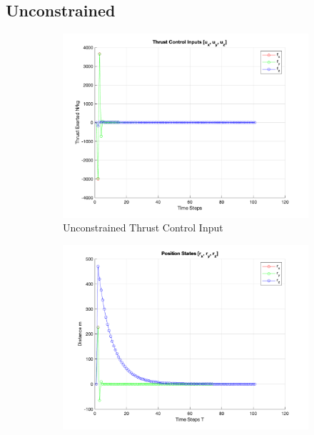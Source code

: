 \documentclass[conference, tikz]{IEEEtran}
\begin{document}
\subsection{Unconstrained}
\begin{figure}[H]
    \centering
    \begin{subfigure}{\columnwidth}
        \centering
        \includegraphics[width=\columnwidth]{new_final_figs/Unconstrained_input_plot.png}
        \caption{Unconstrained Thrust Control Input}
        \label{unconst:control_in}
    \end{subfigure}
    \begin{subfigure}{\columnwidth}
        \centering
        \includegraphics[width=\columnwidth]{new_final_figs/Unconstrained_position_state_plot.png}

\end{subfigure}
\end{figure}
\end{document}
